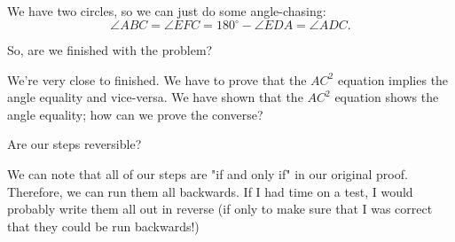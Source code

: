 We have two circles, so we can just do some angle-chasing:
$$ \angle ABC = \angle EFC = 180^\circ - \angle EDA = \angle ADC. $$

So, are we finished with the problem?






We're very close to finished. We have to prove that the $AC^2$ equation implies the angle equality and vice-versa. We have shown that the $AC^2$ equation shows the angle equality; how can we prove the converse?


Are our steps reversible?











We can note that all of our steps are "if and only if" in our original proof. Therefore, we can run them all backwards. If I had time on a test, I would probably write them all out in reverse (if only to make sure that I was correct that they could be run backwards!)

